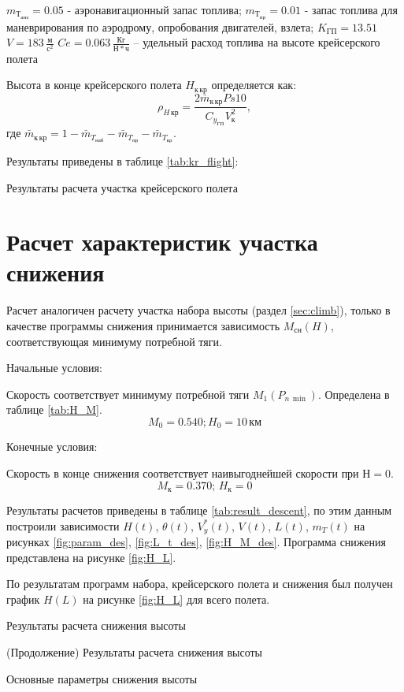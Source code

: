 $m_{Т_{анз}} = 0.05$ - аэронавигационный запас топлива;
$m_{Т_{пр}} = 0.01$ - запас топлива для маневрирования по аэродрому, опробования
двигателей, взлета;
$K_{ГП} = 13.51$
$V = 183\, \frac{м}{с^2}$
$Ce= 0.063\, \frac{Кг}{Н*ч} $ – удельный расход топлива на высоте крейсерского
полета

Высота в конце крейсерского полета $H_{к\, кр}$ определяется как:
\begin{equation}
    \rho_{H\, {кр}} = \frac{2 \bar{m}_{к\, кр} Ps 10 }{C_{y_{ГП}} V_к^2},
\end{equation}
где $\bar{m}_{к\, кр} = 1 - \bar{m}_{T_{наб}} - \bar{m}_{T_{пр}} -
\bar{m}_{T_{кр}}$.

Результаты приведены в таблице \ref{tab:kr_flight}:

\begin{table}[H]
    \centering
    \caption{Результаты расчета участка крейсерского полета}
    \label{tab:kr_flight}
    
\end{table}

\section{Расчет характеристик участка снижения}\label{sec:descent}
Расчет аналогичен расчету участка набора высоты (раздел \ref{sec:climb}),
только в качестве программы снижения принимается зависимость $M_{сн}(H)$,
соответствующая минимуму потребной тяги.

Начальные условия:

Скорость соответствует минимуму потребной тяги $M_1(P_{n\, \min})$. Определена
в таблице \ref{tab:H_M}.
\[
    M_0=0.540; H_0 = 10\, \text{км}
\]

Конечные условия:

Скорость в конце снижения соответствует наивыгоднейшей скорости при $Н=0$.
\[
    M_к = 0.370;\, H_к = 0
\]

Результаты расчетов приведены в таблице \ref{tab:result_descent}, по этим
данным построили зависимости $H(t)$, $\theta(t)$, $V_y^*(t)$, $V(t)$,
$L(t)$, $m_T(t)$ на рисунках \ref{fig:param_des}, \ref{fig:L_t_des},
\ref{fig:H_M_des}. Программа снижения представлена на рисунке \ref{fig:H_L}.

По результатам программ набора, крейсерского полета и снижения был получен график
$H(L)$ на рисунке \ref{fig:H_L} для всего полета.

\begin{sidewaystable}[ph!]
    \centering
    \caption{Результаты расчета снижения высоты}
    \label{tab:result_descent}
    
    \centering
    \addtocounter{table}{-1}
    \addtocounter{totaltables}{-1}
    \caption{(Продолжение) Результаты расчета снижения высоты}
    
    \caption{Основные параметры снижения высоты}
    
    \label{tab:minitable_descent}
\end{sidewaystable}
\newpage

